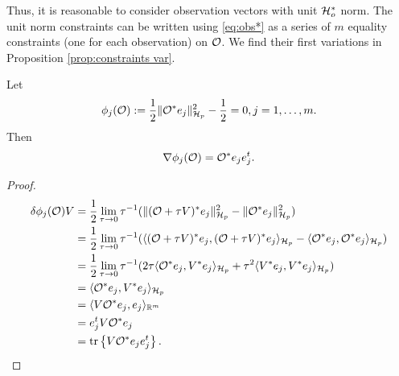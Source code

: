 Thus, it is reasonable to consider observation vectors with unit
$\mathcal{H}_o^*$ norm. The unit norm constraints can be written using
\eqref{eq:obs*} as a series of $m$ equality constraints (one for each
observation) on $\mathcal{O}$. We find their first variations in Proposition
\ref{prop:constraints var}.



\begin{proposition}\label{prop:constraints var}
  Let
  \begin{align*}
    \phi_j(\obs) :=\frac12 \| \obs^* e_j\|_{\hilp}^2 - \frac12 = 0,j=1,\dots,m.
  \end{align*}
  Then
  \begin{equation*}
    \nabla \phi_j(\obs) = \obs^* e_je_j^t.
  \end{equation*}
\end{proposition}

\begin{proof}
  \begin{align*}
    \delta \phi_j(\obs)V  
    &= \frac12\lim_{\tau \to 0}\tau^{-1}
    ( \|(\obs + \tau V)^*e_j \|_{\hilp}^2 - \|\obs ^*e_j \|_{\hilp}^2  ) \\
    &= \frac12\lim_{\tau \to 0}\tau^{-1}
    ( \langle (\obs + \tau V)^*e_j, (\obs + \tau V)^*e_j \rangle_{\hilp} - 
    \langle \obs^*e_j, \obs^*e_j \rangle_{\hilp} ) \\
    &= \frac12\lim_{\tau \to 0}\tau^{-1}
    (2\tau \langle \obs^*e_j,V^*e_j \rangle_{\hilp} 
    +\tau^2 \langle V^*e_j, V^*e_j \rangle_{\hilp} ) \\
    &= \langle \obs^*e_j,V^*e_j \rangle_{\hilp} \\
    &= \langle V \obs^*e_j,e_j \rangle_{\R^m} \\
    &= e_j^t V \obs^* e_j \\
    &= \tr{V \obs^* e_je_j^t}.
  \end{align*}
\end{proof}




